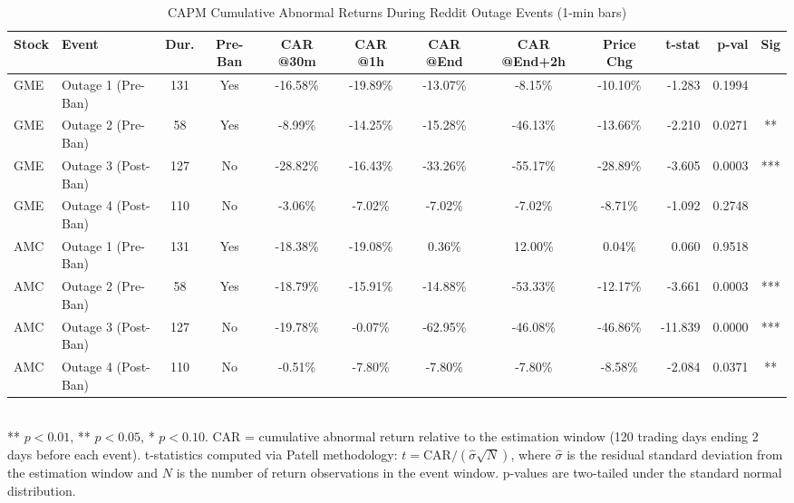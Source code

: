 \begin{table}[htbp]
  \centering
  \caption{CAPM Cumulative Abnormal Returns During Reddit Outage Events (1-min bars)}
  \label{tab:capm_car}
  \begin{tabular}{llcccccccrrc}
    \hline\hline
    Stock & Event & Dur. & Pre-Ban & CAR @30m & CAR @1h & CAR @End & CAR @End+2h & Price Chg & t-stat & p-val & Sig \\
    \hline
    GME & Outage 1 (Pre-Ban) & 131 & Yes & -16.58\% & -19.89\% & -13.07\% & -8.15\% & -10.10\% & -1.283 & 0.1994 &  \\
    GME & Outage 2 (Pre-Ban) & 58 & Yes & -8.99\% & -14.25\% & -15.28\% & -46.13\% & -13.66\% & -2.210 & 0.0271 & ** \\
    GME & Outage 3 (Post-Ban) & 127 & No & -28.82\% & -16.43\% & -33.26\% & -55.17\% & -28.89\% & -3.605 & 0.0003 & *** \\
    GME & Outage 4 (Post-Ban) & 110 & No & -3.06\% & -7.02\% & -7.02\% & -7.02\% & -8.71\% & -1.092 & 0.2748 &  \\
    \hline
    AMC & Outage 1 (Pre-Ban) & 131 & Yes & -18.38\% & -19.08\% & 0.36\% & 12.00\% & 0.04\% & 0.060 & 0.9518 &  \\
    AMC & Outage 2 (Pre-Ban) & 58 & Yes & -18.79\% & -15.91\% & -14.88\% & -53.33\% & -12.17\% & -3.661 & 0.0003 & *** \\
    AMC & Outage 3 (Post-Ban) & 127 & No & -19.78\% & -0.07\% & -62.95\% & -46.08\% & -46.86\% & -11.839 & 0.0000 & *** \\
    AMC & Outage 4 (Post-Ban) & 110 & No & -0.51\% & -7.80\% & -7.80\% & -7.80\% & -8.58\% & -2.084 & 0.0371 & ** \\
    \hline\hline
  \end{tabular}
  \\[4pt]
  {\small *** $p<0.01$, ** $p<0.05$, * $p<0.10$. CAR = cumulative abnormal return relative to the estimation window (120 trading days ending 2 days before each event). t-statistics computed via Patell methodology: $t = \text{CAR} / (\hat{\sigma} \sqrt{N})$, where $\hat{\sigma}$ is the residual standard deviation from the estimation window and $N$ is the number of return observations in the event window. p-values are two-tailed under the standard normal distribution.}
\end{table}
